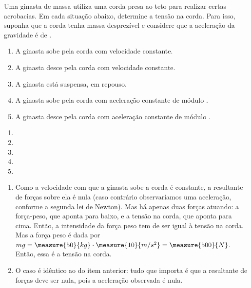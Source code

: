 \begin{question}
    Uma ginasta de massa  utiliza uma corda presa ao teto para realizar certas acrobacias.
    Em cada situação abaixo, determine a tensão na corda.
    Para isso, suponha que a corda tenha massa desprezível e considere que a aceleração da gravidade é de .
    \begin{enumerate}
      \item A ginasta sobe pela corda com velocidade constante.
      \item A ginasta desce pela corda com velocidade constante.
      \item A ginasta está suspensa, em repouso.
      \item A ginasta sobe pela corda com aceleração constante de módulo .
      \item A ginasta desce pela corda com aceleração constante de módulo .
    \end{enumerate}

    \begin{answer}
      \begin{enumerate}
        \item {}
        \item {}
        \item {}
        \item {}
        \item {}
      \end{enumerate}
    \end{answer}

    \begin{solution}
      \begin{enumerate}
        \item Como a velocidade com que a ginasta sobe a corda é constante, a resultante de forças sobre ela é nula (caso contrário observaríamos uma aceleração, conforme a segunda lei de Newton).
        Mas há apenas duas forças atuando: a força-peso, que aponta para baixo, e a tensão na corda, que aponta para cima.
        Então, a intensidade da força peso tem de ser igual à tensão na corda.
        Mas a força peso é dada por $mg = \measure{50}{kg} \cdot \measure{10}{m/s^2} = \measure{500}{N}$.
        Então, essa é a tensão na corda.

        \item O caso é idêntico ao do item anterior: tudo que importa é que a resultante de forças deve ser nula, pois a aceleração observada é nula.


\end{enumerate}
\end{solution}
\end{question}
